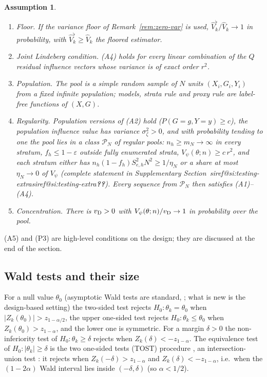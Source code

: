 \documentclass[pdflatex,sn-mathphys-num,iicol]{sn-jnl}
\makeatletter
\theoremstyle{thmstyleone}
\theoremstyle{thmstyletwo}
\newtheorem{assumption}{Assumption}
\theoremstyle{thmstylethree}
\newcommand{\SIref}[1]{\ifcsname siref@#1\endcsname\csname siref@#1\endcsname\else\textbf{??}\fi}
\makeatother
\begin{document}
\begin{assumption}\label{ass:testing}
\begin{enumerate}
\item[(A5)] \emph{Floor.} If the variance floor of Remark~\ref{rem:zero-var} is used, $\hat V_k^{\flat}/\hat V_k\to1$ in probability, with $\hat V_k^\flat\ge\hat V_k$ the floored estimator.
\item[(A4$_Q$)] \emph{Joint Lindeberg condition.} (A4) holds for every linear combination of the $Q$ residual influence vectors whose variance is of exact order $r^2$.
\item[(P1)] \emph{Population.} The pool is a simple random sample of $N$ units $(X_i,G_i,Y_i)$ from a fixed infinite population; models, strata rule and proxy rule are label-free functions of $(X,G)$.
\item[(P2)] \emph{Regularity.} Population versions of (A2) hold ($P(G=g,Y=y)\ge c$), the population influence value has variance $\sigma^2_\zeta>0$, and with probability tending to one the pool lies in a class $\mathcal P_N$ of regular pools: $n_h\ge m_N\to\infty$ in every stratum, $f_h\le1-\varepsilon$ outside fully enumerated strata, $V_\psi(\theta;n)\ge c\,r^2$, and each stratum either has $n_h(1-f_h)S^2_{e,h}N^2\ge1/\eta_N$ or a share at most $\eta_N\to0$ of $V_\psi$ (complete statement in Supplementary Section~\SIref{si:testing-extra}). Every sequence from $\mathcal P_N$ then satisfies (A1)--(A4).
\item[(P3)] \emph{Concentration.} There is $v_{\rm D}>0$ with $V_\psi(\theta;n)/v_{\rm D}\to1$ in probability over the pool.
\end{enumerate}
\end{assumption}

(A5) and (P3) are high-level conditions on the design; they are discussed at the end of the section.

\subsection{Wald tests and their size}\label{sec:test-size}

For a null value $\theta_0$ (asymptotic Wald tests are standard, \citealt[Ch.~11]{lehmann2005}; what is new is the design-based setting) the two-sided test rejects $H_0:\theta_k=\theta_0$ when $|Z_k(\theta_0)|>z_{1-\alpha/2}$, the upper one-sided test rejects $H_0:\theta_k\le\theta_0$ when $Z_k(\theta_0)>z_{1-\alpha}$, and the lower one is symmetric. For a margin $\delta>0$ the non-inferiority test of $H_0:\theta_k\ge\delta$ rejects when $Z_k(\delta)<-z_{1-\alpha}$. The equivalence test of $H_0:|\theta_k|\ge\delta$ is the two one-sided tests (TOST) procedure \citep{schuirmann1987,wellek2010}, an intersection-union test \citep{berger1982,berger1996}: it rejects when $Z_k(-\delta)>z_{1-\alpha}$ and $Z_k(\delta)<-z_{1-\alpha}$, i.e.\ when the $(1-2\alpha)$ Wald interval lies inside $(-\delta,\delta)$ (so $\alpha<1/2$).
\end{document}
